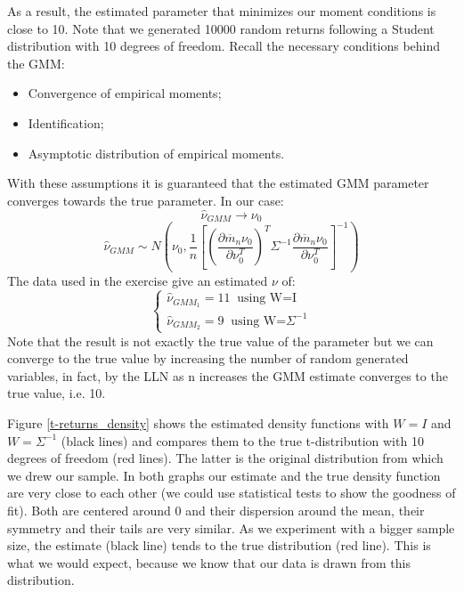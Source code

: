 \newpage
As a result, the estimated parameter that minimizes our moment conditions is close to 10. Note that we generated 10000 random returns following a Student distribution with 10 degrees of freedom. Recall the necessary conditions behind the GMM:
\begin{itemize}
    \item Convergence of empirical moments;
    \item Identification;
    \item Asymptotic distribution of empirical moments.
\end{itemize}
With these assumptions it is guaranteed that the estimated GMM parameter converges towards the true parameter. In our case:
\begin{equation*}
        \widehat{\nu}_{GMM} \to \nu_0
\end{equation*}
\begin{equation*}
        \widehat{\nu}_{GMM} \sim N(\nu_0,
        \frac{1}{n}[(\frac{\partial\overline{m}_n\nu_0}{\partial\nu_0^T})^T\Sigma^{-1}\frac{\partial\overline{m}_n\nu_0}{\partial\nu_0^T}]^{-1})
\end{equation*}
The data used in the exercise give an estimated $\nu$ of:
\begin{equation*}
    \begin{cases}
    \widehat{\nu}_{GMM_{1}}=11 \;\;\text{using W=I}\\
    \widehat{\nu}_{GMM_{2}}=9 \;\;\text{using W=}\Sigma^{-1}
\end{cases}
\end{equation*}
Note that the result is not exactly the true value of the parameter but we can converge to the true value by increasing the number of random generated variables, in fact, by the LLN as n increases the GMM estimate converges to the true value, i.e. 10.

Figure \ref{t-returns_density} shows the estimated density functions with $W=I$ and $W=\Sigma^{-1}$ (black lines) and compares them to the true t-distribution with 10 degrees of freedom (red lines). The latter is the original distribution from which we drew our sample. In both graphs our estimate and the true density function are very close to each other (we could use statistical tests to show the goodness of fit). Both are centered around 0 and their dispersion around the mean, their symmetry and their tails are very similar. As we experiment with a bigger sample size, the estimate  (black line) tends to the true distribution (red line). This is what we would expect, because we know that our data is drawn from this distribution.


